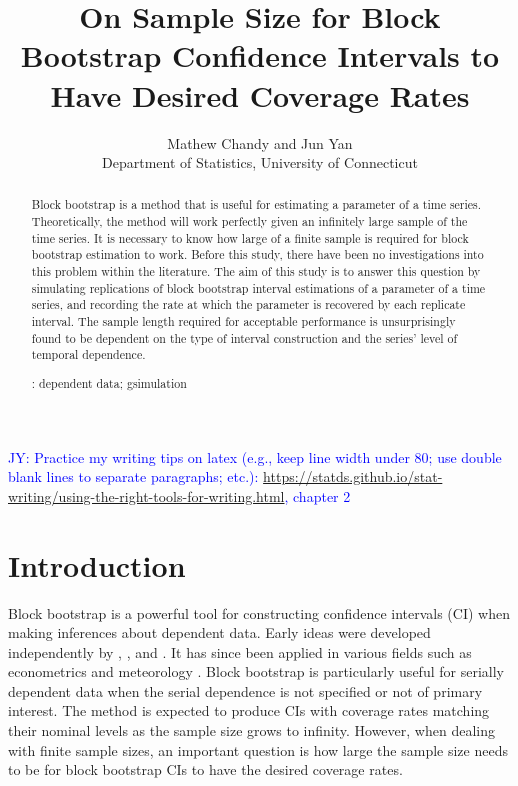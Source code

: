 \documentclass[12pt, letterpaper, titlepage]{article}
\title{On Sample Size for Block Bootstrap Confidence Intervals 
  to Have Desired Coverage Rates}
\author{Mathew Chandy
  and Jun Yan\\[1ex]
  Department of Statistics, University of Connecticut\\
}
\date{}
\newcommand{\jy}[1]{\textcolor{blue}{JY: #1}}
\begin{document}
 
\maketitle

\begin{abstract}
Block bootstrap is a method that is useful for estimating a parameter of a time
series. Theoretically, the method will work perfectly given an infinitely
large sample of the time series. It is necessary to know how large of a finite
sample is required for block bootstrap estimation to work. Before this study,
there have been no investigations into this problem within the literature. The
aim of this study is to answer this question by simulating replications of
block bootstrap interval estimations of a parameter of a time series, and
recording the rate at which the parameter is recovered by each replicate
interval. The sample length required for acceptable performance is
unsurprisingly found to be dependent on the type of interval construction and
the series' level of temporal dependence.


\bigskip
{}:
dependent data; gsimulation
\end{abstract}

\doublespace

\jy{Practice my writing tips on latex (e.g., keep line width under 80; use
  double blank lines to separate paragraphs; etc.):
  \url{
https://statds.github.io/stat-writing/using-the-right-tools-for-writing.html},
  chapter 2}


\section{Introduction}
\label{sec:intro}

Block bootstrap is a powerful tool for constructing confidence intervals (CI)
when making inferences about dependent data. Early ideas were developed
independently by \citet{hall1985resampling}, \citet{carlstein1986use}, and 
\citet{kunsch1989jackknife}.
It has since been applied in various fields such as econometrics
\citep{mackinnon2006bootstrap} and meteorology \citep{varga2017generalised}.
Block bootstrap is particularly useful for serially dependent
data when the serial dependence is not specified or not of primary interest.
The method is expected to produce CIs with coverage rates
matching their nominal levels as the sample size grows to infinity. However,
when dealing with finite sample sizes, an important question is how large the
sample size needs to be for block bootstrap CIs to have the
desired coverage rates.
\end{document}
